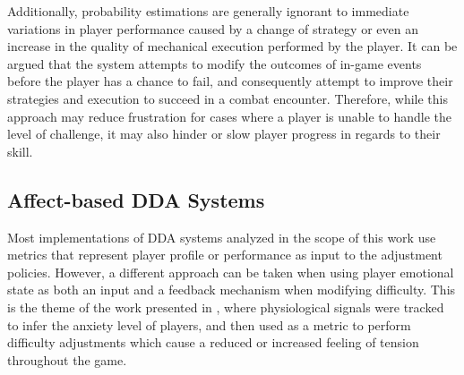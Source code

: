 Additionally, probability estimations are generally ignorant to immediate variations in player performance caused by a change of strategy or even an increase in the quality of mechanical execution performed by the player. It can be argued that the system attempts to modify the outcomes of in-game events before the player has a chance to fail, and consequently attempt to improve their strategies and execution to succeed in a combat encounter. Therefore, while this approach may reduce frustration for cases where a player is unable to handle the level of challenge, it may also hinder or slow player progress in regards to their skill.


\subsection{Affect-based DDA Systems}




Most implementations of DDA systems analyzed in the scope of this work use metrics that represent player profile or performance as input to the adjustment policies. However, a different approach can be taken when using player emotional state as both an input and a feedback mechanism when modifying difficulty. This is the theme of the work presented in \cite{article_affectivedda}, where physiological signals were tracked to infer the anxiety level of players, and then used as a metric to perform difficulty adjustments which cause a reduced or increased feeling of tension throughout the game.

